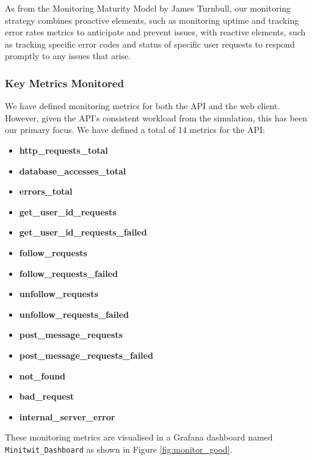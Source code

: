 As from the Monitoring Maturity Model by James Turnbull\cite{MonitoringMaturityModel}, our monitoring strategy combines proactive elements, such as monitoring uptime and tracking error rates metrics to anticipate and prevent issues, with reactive elements, such as tracking specific error codes and status of specific user requests to respond promptly to any issues that arise.





\subsubsection*{Key Metrics Monitored}
We have defined monitoring metrics for both the API and the web client. However, given the API's consistent workload from the simulation, this has been our primary focus. We have defined a total of 14 metrics for the API:
\begin{multicols}{2}
\begin{itemize}
    \item \textbf{http\_requests\_total}
    \item \textbf{database\_accesses\_total}
    \item \textbf{errors\_total}
    \item \textbf{get\_user\_id\_requests}
    \item \textbf{get\_user\_id\_requests\_failed}
    \item \textbf{follow\_requests}
    \item \textbf{follow\_requests\_failed}
    \item \textbf{unfollow\_requests}
    \item \textbf{unfollow\_requests\_failed}
    \item \textbf{post\_message\_requests}
    \item \textbf{post\_message\_requests\_failed}
    \item \textbf{not\_found}
    \item \textbf{bad\_request}
    \item \textbf{internal\_server\_error}
\end{itemize}
\end{multicols}

These monitoring metrics are visualised in a Grafana dashboard named \texttt{Minitwit\_Dashboard} as shown in Figure \ref{fig:monitor_good}. 

